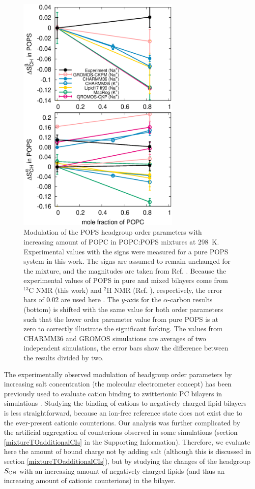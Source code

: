 \documentclass[journal=jpcbfk,manuscript=article]{achemso}
\begin{document}
\begin{figure}[!tb]
  \centering
  \includegraphics[width=8.0cm]{../Figs/HGorderparametersPSvsPC.eps}
  \caption{\label{HGorderparametersPSvsPC}
    Modulation of the POPS headgroup order parameters with increasing amount of POPC in POPC:POPS mixtures at 298~K.
    Experimental values with the signs were measured for a pure POPS system in this work.
    The signs are assumed to remain unchanged for the mixture, and the magnitudes are taken from Ref. .
    Because the experimental values of POPS in pure and mixed bilayers come from $^{13}$C NMR (this work) and $^2$H NMR (Ref. ), respectively,
    the error bars of 0.02 are used here \cite{botan15,ollila16}.
    The $y$-axis for the $\alpha$-carbon results (bottom) is shifted
    with the same value for both order parameters such that the lower order
    parameter value from pure POPS is at zero to correctly illustrate the significant forking.
    The values from CHARMM36 and GROMOS simulations are averages of two independent simulations,
    the error bars show the difference between the results divided by two. 
  }
\end{figure}



The experimentally observed modulation of headgroup order parameters
by increasing salt concentration (the molecular electrometer concept) has been previously used to evaluate cation binding to zwitterionic PC bilayers in simulations \cite{catte16}.
Studying the binding of cations to negatively charged lipid bilayers is less straightforward, because an ion-free reference state does not exist due to the ever-present cationic
counterions. Our analysis was further complicated by the artificial aggregation of counterions
observed in some simulations (section \ref{mixtureTOadditionalCIs} in the Supporting Information).
Therefore, we evaluate here the amount of bound charge not by adding salt
(although this is discussed in section \ref{mixtureTOadditionalCIs}),
but by studying the changes of the headgroup $S_{\rm CH}$ with an increasing amount of
negatively charged lipids (and thus an increasing amount of cationic counterions) in the bilayer.
\end{document}
